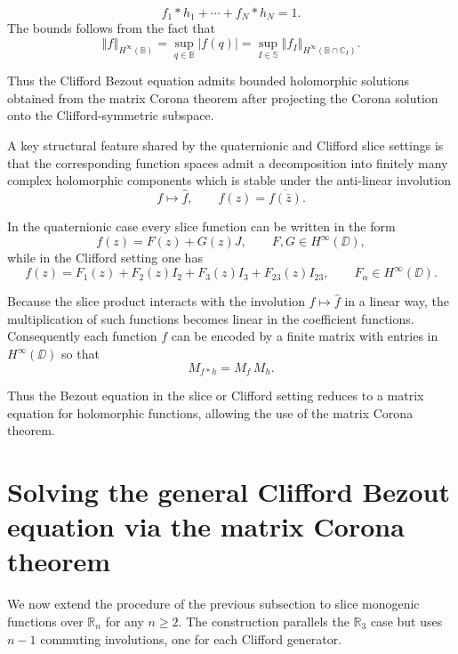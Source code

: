\documentclass[11pt]{amsart}
\begin{document}
\[
f_{1}*h_{1}+\cdots+f_{N}*h_{N}=1.
\]
The bounds follows from the fact that
$$
\left\Vert f\right\Vert_{H^{\infty}(\mathbb{B})}=\sup_{q\in\mathbb{B}}\vert f(q)\vert=\sup_{I\in\mathbb{S}}\left\Vert f_I\right\Vert_{H^{\infty}(\mathbb{B}\cap\mathbb{C}_I)}.
$$

Thus the Clifford Bezout equation admits bounded holomorphic solutions obtained from the matrix Corona theorem after projecting the Corona solution onto the Clifford-symmetric subspace.

\begin{rem}\label{rem:matrix_structure}
A key structural feature shared by the quaternionic and Clifford slice settings is that the corresponding function spaces admit a decomposition into finitely many complex holomorphic components which is stable under the anti-linear involution
\[
f \mapsto \hat f, \qquad \hat f(z)=\overline{f(\bar z)}.
\]

In the quaternionic case every slice function can be written in the form
\[
f(z)=F(z)+G(z)J,
\qquad F,G\in H^\infty(\DD),
\]
while in the Clifford setting one has
\[
f(z)=F_1(z)+F_2(z)I_2+F_3(z)I_3+F_{23}(z)I_{23},
\qquad F_\alpha\in H^\infty(\DD).
\]

Because the slice product interacts with the involution $f\mapsto\hat f$ in a linear way, the multiplication of such functions becomes linear in the coefficient functions.  Consequently each function $f$ can be encoded by a finite matrix with entries in $H^\infty(\DD)$ so that
\[
M_{f*h}=M_f\,M_h .
\]

Thus the Bezout equation in the slice or Clifford setting reduces to a matrix equation for holomorphic functions, allowing the use of the matrix Corona theorem.
\end{rem}









\section{Solving the general Clifford Bezout equation via the matrix Corona theorem}
\label{subsec:Bezout-general}

We now extend the procedure of the previous subsection to slice monogenic functions over $\mathbb{R}_n$ for any $n \ge 2$. The construction parallels the $\mathbb{R}_3$ case but uses $n-1$ commuting involutions, one for each Clifford generator.
\end{document}
